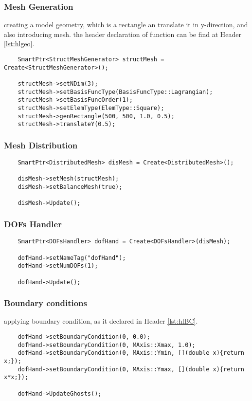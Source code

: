 \documentclass[]{article}
\begin{document}
\subsubsection{Mesh Generation} \label{sec: mshG}
creating a model geometry, which is a rectangle an translate it in y-direction, and also introducing mesh. the header declaration of function can be find at Header \ref{lst:hlgeo}. 
\begin{lstlisting}
	SmartPtr<StructMeshGenerator> structMesh = Create<StructMeshGenerator>();
	
	structMesh->setNDim(3);
	structMesh->setBasisFuncType(BasisFuncType::Lagrangian);
	structMesh->setBasisFuncOrder(1);
	structMesh->setElemType(ElemType::Square);
	structMesh->genRectangle(500, 500, 1.0, 0.5);
	structMesh->translateY(0.5);
\end{lstlisting}

\subsubsection{Mesh Distribution} \label{sec: mshD}
\begin{lstlisting}
	SmartPtr<DistributedMesh> disMesh = Create<DistributedMesh>();
	
	disMesh->setMesh(structMesh);
	disMesh->setBalanceMesh(true);
	
	disMesh->Update();
\end{lstlisting}

\subsubsection{DOFs Handler} \label{sec: dofC}
\begin{lstlisting}
	SmartPtr<DOFsHandler> dofHand = Create<DOFsHandler>(disMesh);
	
	dofHand->setNameTag("dofHand");
	dofHand->setNumDOFs(1);
	
	dofHand->Update();
\end{lstlisting}

\subsubsection{Boundary conditions} \label{sec: BC}
applying boundary condition, as it declared in Header \ref{lst:hlBC}.
\begin{lstlisting}
	dofHand->setBoundaryCondition(0, 0.0); 
	dofHand->setBoundaryCondition(0, MAxis::Xmax, 1.0);
	dofHand->setBoundaryCondition(0, MAxis::Ymin, [](double x){return x;});
	dofHand->setBoundaryCondition(0, MAxis::Ymax, [](double x){return x*x;});
	
	dofHand->UpdateGhosts();
\end{lstlisting}
\end{document}
